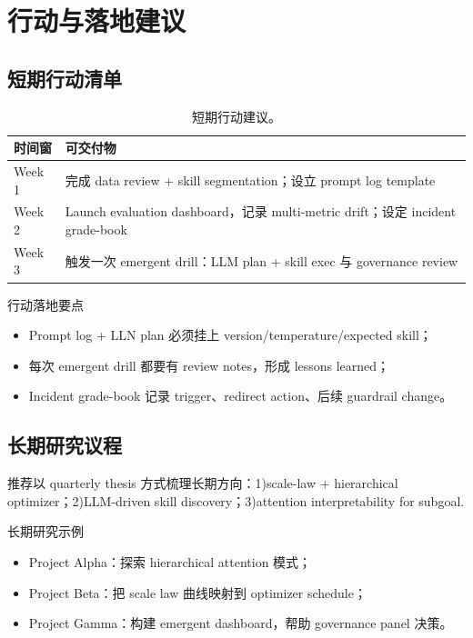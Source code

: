 \section{行动与落地建议}

\subsection{短期行动清单}

\begin{table}[H]
\centering
\begin{tabular}{p{3cm}p{6cm}}
\toprule
时间窗 & 可交付物 \\
\midrule
Week 1 & 完成 data review + skill segmentation；设立 prompt log template \\
Week 2 & Launch evaluation dashboard，记录 multi-metric drift；设定 incident grade-book \\
Week 3 & 触发一次 emergent drill：LLM plan + skill exec 与 governance review \\
\bottomrule
\end{tabular}
\caption{短期行动建议。}
\end{table}

\begin{importantbox}{行动落地要点}
\begin{itemize}
    \item Prompt log + LLN plan 必须挂上 version/temperature/expected skill；
    \item 每次 emergent drill 都要有 review notes，形成 lessons learned；
    \item Incident grade-book 记录 trigger、redirect action、后续 guardrail change。
\end{itemize}
\end{importantbox}

\subsection{长期研究议程}

推荐以 quarterly thesis 方式梳理长期方向：1)scale-law + hierarchical optimizer；2)LLM-driven skill discovery；3)attention interpretability for subgoal.

\begin{knowledgebox}{长期研究示例}
\begin{itemize}
    \item Project Alpha：探索 hierarchical attention 模式；
    \item Project Beta：把 scale law 曲线映射到 optimizer schedule；
    \item Project Gamma：构建 emergent dashboard，帮助 governance panel 决策。
\end{itemize}
\end{knowledgebox}

